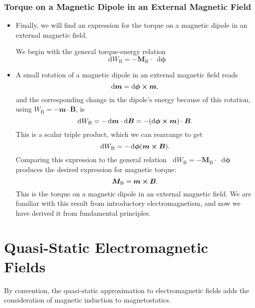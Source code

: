 \documentclass[11pt, a4paper]{article}
\newcommand{\diff}{\mathop{}\!\mathrm{d}} %
\renewcommand{\vec}[1]{\bm{#1}} %
\newcommand{\B}{\vec{B}} %
\newcommand{\m}{\vec{m}}  %
\begin{document}
\subsubsection{Torque on a Magnetic Dipole in an External Magnetic Field}
\begin{itemize}
	\item Finally, we will find an expression for the torque on a magnetic dipole in an external magnetic field. 

    We begin with the general torque-energy relation
	\begin{equation*}
		\diff W_{\text{B}} = - \vec{M}_{\text{B}}\cdot \diff \vec{\phi}
	\end{equation*}
	
	\item A small rotation of a magnetic dipole in an external magnetic field reads
	\begin{equation*}
		\diff \vec{m} = \diff \vec{\phi} \cross \m,
	\end{equation*}
	and the corresponding change in the dipole's energy because of this rotation, using $ W_{\text{B}} = - \m \cdot \B $, is
	\begin{equation*}
		\diff W_{\text{B}} = - \diff \m \cdot \diff \B = - (\diff \vec{\phi} \cross \m)\cdot \B.
	\end{equation*}
	This is a scalar triple product, which we can rearrange to get
	\begin{equation*}
		\diff W_{\text{B}} = - \diff \vec{\phi}(\m \cross \B).
	\end{equation*}
	Comparing this expression to the general relation $ \diff W_{\text{B}} = - \vec{M}_{\text{B}}\cdot \diff \vec{\phi} $ produces the desired expression for magnetic torque:
	\begin{equation*}
		\vec{M}_{\text{B}} = \m \cross \B.
	\end{equation*}
	This is the torque on a magnetic dipole in an external magnetic field. We are familiar with this result from introductory electromagnetism, and now we have derived it from fundamental principles.
\end{itemize}

\newpage
\section{Quasi-Static Electromagnetic Fields}
By convention, the quasi-static approximation to electromagnetic fields adds the consideration of magnetic induction to magnetostatics. 
\end{document}
